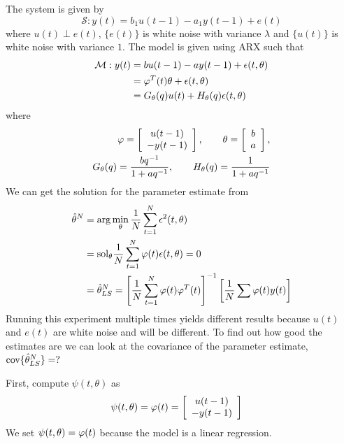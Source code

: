 \begin{example}
\label{ex:15arx}
The system is given by
$$\mathcal{S}: y(t) = b_1u(t-1)-a_1y(t-1)+e(t)$$
where $u(t)\perp e(t)$, $\{e(t)\}$ is white noise with variance $\lambda$ and $\{u(t)\}$ is white noise with variance $1$. The model is given using ARX such that
\begin{align*}
\mathcal{M}: y(t) &= bu(t-1)-ay(t-1)+\epsilon(t,\theta) \\
&= \varphi^T(t)\theta+\epsilon(t,\theta) \\
&= G_\theta(q)u(t) + H_\theta(q)\epsilon(t,\theta)
\end{align*}
where
\begin{align*}
\varphi = \left[\begin{array}{c} u(t-1) \\ -y(t-1) \end{array}\right], \qquad \theta = \left[\begin{array}{c} b \\ a \end{array}\right], \\ G_\theta(q) = \frac{bq^{-1}}{1+aq^{-1}}, \qquad H_\theta(q) = \frac{1}{1+aq^{-1}}
\end{align*}
We can get the solution for the parameter estimate from
\begin{align*}
\hat{\theta}^N &= \arg\min_\theta\frac{1}{N}\sum_{t=1}^N\epsilon^2(t,\theta) \\
&= \text{sol}_\theta\frac{1}{N}\sum_{t=1}^N\varphi(t)\epsilon(t,\theta) = 0 \\
&= \hat{\theta}_{LS}^N = \left[\frac{1}{N}\sum_{t=1}^N\varphi(t)\varphi^T(t)\right]^{-1}\left[\frac{1}{N}\sum\varphi(t)y(t)\right]
\end{align*}
Running this experiment multiple times yields different results because $u(t)$ and $e(t)$ are white noise and will be different. To find out how good the estimates are we can look at the covariance of the parameter estimate, $\text{cov}\{\hat{\theta}_{LS}^N\}=?$

First, compute $\psi(t,\theta)$ as
\begin{align*}
\psi(t,\theta) &= \varphi(t) = \left[\begin{array}{c} u(t-1) \\ -y(t-1) \end{array}\right]
\end{align*}
We set $\psi(t,\theta)=\varphi(t)$ because the model is a linear regression.


\end{example}
